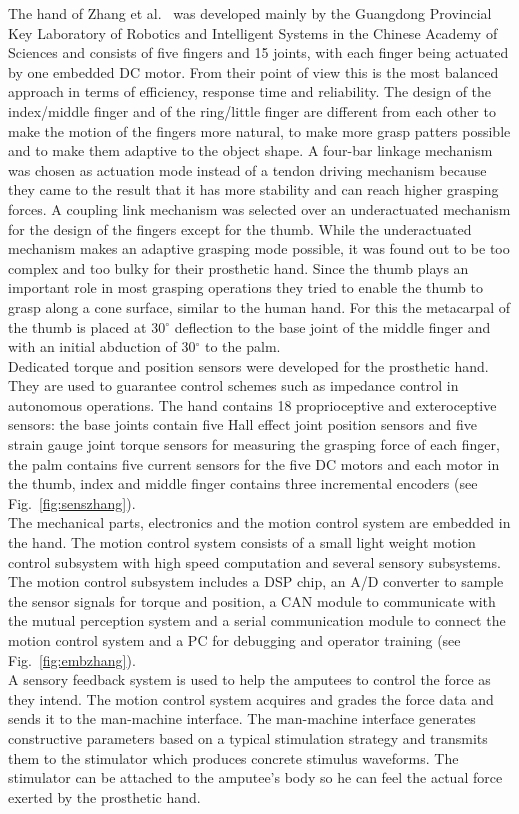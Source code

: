 \documentclass[a4paper, 10pt, conference]{ieeeconf}      %
\begin{document}
The hand of Zhang et al.~\cite{zhang} was developed mainly by the Guangdong Provincial Key Laboratory of Robotics and Intelligent Systems in the Chinese Academy of Sciences and consists of five fingers and 15 joints, with each finger being actuated by one embedded DC motor. From their point of view this is the most balanced approach in terms of efficiency, response time and reliability. The design of the index/middle finger and of the ring/little finger are different from each other to make the motion of the fingers more natural, to make more grasp patters possible and to make them adaptive to the object shape. A four-bar linkage mechanism was chosen as actuation mode instead of a tendon driving mechanism because they came to the result that it has more stability and can reach higher grasping forces. A coupling link mechanism was selected over an underactuated mechanism for the design of the fingers except for the thumb. While the underactuated mechanism makes an adaptive grasping mode possible, it was found out to be too complex and too bulky for their prosthetic hand. Since the thumb plays an important role in most grasping operations they tried to enable the thumb to grasp along a cone surface, similar to the human hand. For this the metacarpal of the thumb is placed at 30$^\circ$ deflection to the base joint of the middle finger and with an initial abduction of 30$^\circ$ to the palm.\\
Dedicated torque and position sensors were developed for the prosthetic hand. They are used to guarantee control schemes such as impedance control in autonomous operations. The hand contains 18 proprioceptive and exteroceptive sensors: the base joints contain five Hall effect joint position sensors and five strain gauge joint torque sensors for measuring the grasping force of each finger, the palm contains five current sensors for the five DC motors and each motor in the thumb, index and middle finger contains three incremental encoders (see Fig.~\ref{fig:senszhang}).\\
The mechanical parts, electronics and the motion control system are embedded in the hand. The motion control system consists of a small light weight motion control subsystem with high speed computation and several sensory subsystems. The motion control subsystem includes a DSP chip, an A/D converter to sample the sensor signals for torque and position, a CAN module to communicate with the mutual perception system and a serial communication module to connect the motion control system and a PC for debugging and operator training (see Fig.~\ref{fig:embzhang}).\\
A sensory feedback system is used to help the amputees to control the force as they intend. The motion control system acquires and grades the force data and sends it to the man-machine interface. The man-machine interface generates constructive parameters based on a typical stimulation strategy and transmits them to the stimulator which produces concrete stimulus waveforms. The stimulator can be attached to the amputee's body so he can feel the actual force exerted by the prosthetic hand.
\end{document}
